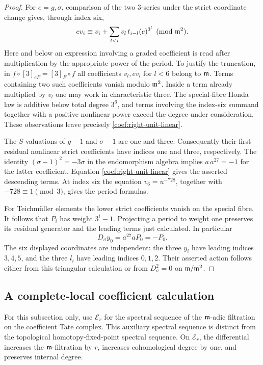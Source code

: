 \begin{proof}
For \(e=g,\sigma\), comparison of the two 3-series under the strict
coordinate change gives, through index six,
\begin{equation}\label{coef:right-unit-linear}
 ev_i\equiv v_i+\sum_{l<i}v_l\,t_{i-l}(e)^{3^l}
 \pmod{\mathfrak m^2}.
\end{equation}
Here and below an expression involving a graded coefficient is read
after multiplication by the appropriate power of the period.
To justify the truncation, in
\(f\circ[3]_{eF}=[3]_F\circ f\) all coefficients \(v_l,ev_l\) for
\(l<6\) belong to \(\mathfrak m\).  Terms containing two such coefficients
vanish modulo \(\mathfrak m^2\).  Inside a term already multiplied by \(v_l\)
one may work in characteristic three.  The special-fibre Honda law is
additive below total degree \(3^6\), and terms involving the
index-six summand together with a positive nonlinear power exceed the
degree under consideration.  These observations leave precisely
\eqref{coef:right-unit-linear}.

The \(S\)-valuations of \(g-1\) and \(\sigma-1\) are one and three.
Consequently their first residual nonlinear strict coefficients have
indices one and three, respectively.  The identity
\((\sigma-1)^2=-3\sigma\) in the endomorphism algebra implies
\(a\,a^{27}=-1\) for the latter coefficient.  Equation
\eqref{coef:right-unit-linear} gives the asserted descending terms.
At index six the equation \(v_6=u^{-728}\), together with
\(-728\equiv1\pmod3\), gives the period formulas.

For Teichm\"uller elements the lower strict coefficients vanish on the
special fibre.  It follows that \(P_i\) has weight \(3^i-1\).
Projecting a period to weight one preserves its residual generator and
the leading terms just calculated.  In particular
\[
 D_\sigma y_0=a^{27}aP_0=-P_0.
\]
The six displayed coordinates are independent: the three \(y_i\)
have leading indices \(3,4,5\), and the three \(l_i\) have leading
indices \(0,1,2\).  Their asserted action follows either from this
triangular calculation or from
\(D_\sigma^2=0\) on \(\mathfrak m/\mathfrak m^2\).
\end{proof}

\subsection{A complete-local coefficient calculation}

For this subsection only, use \(\mathcal E_r\) for the spectral sequence
of the \(\mathfrak m\)-adic filtration on the coefficient Tate complex.  This
auxiliary spectral sequence is distinct from the topological
homotopy-fixed-point spectral sequence.  On \(\mathcal E_r\), the
differential increases the \(\mathfrak m\)-filtration by \(r\), increases
cohomological degree by one, and preserves internal degree.

